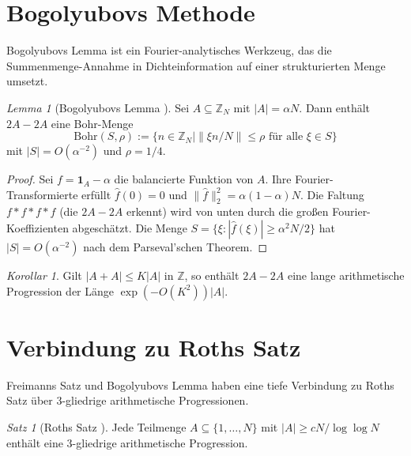 \documentclass[12pt,a4paper]{amsart}
\theoremstyle{definition}
\theoremstyle{remark}
\newtheorem{satz}[theorem]{Satz}
\newtheorem{korollar}[theorem]{Korollar}
\newtheorem{lemma_de}[theorem]{Lemma}
\newcommand{\Z}{\mathbb{Z}}
\begin{document}
\section{Bogolyubovs Methode}\label{sec:bogolyubov}

Bogolyubovs Lemma ist ein Fourier-analytisches Werkzeug, das die Summenmenge-Annahme
in Dichteinformation auf einer strukturierten Menge umsetzt.

\begin{lemma_de}[Bogolyubovs Lemma \cite{Bogolyubov1939}]\label{lem:bogolyubov}
Sei $A \subseteq \Z_N$ mit $|A| = \alpha N$. Dann enthält $2A - 2A$ eine Bohr-Menge
\[
  \mathrm{Bohr}(S, \rho) := \{n \in \Z_N \mid \|\xi n / N\| \leq \rho
  \text{ für alle } \xi \in S\}
\]
mit $|S| = O(\alpha^{-2})$ und $\rho = 1/4$.
\end{lemma_de}

\begin{proof}
Sei $f = \mathbf{1}_A - \alpha$ die balancierte Funktion von $A$. Ihre
Fourier-Transformierte erfüllt $\hat{f}(0) = 0$ und $\|\hat{f}\|_2^2 =
\alpha(1-\alpha)N$. Die Faltung $f * f * f * f$ (die $2A - 2A$ erkennt) wird von
unten durch die großen Fourier-Koeffizienten abgeschätzt. Die Menge
$S = \{\xi : |\hat{f}(\xi)| \geq \alpha^2 N / 2\}$ hat $|S| = O(\alpha^{-2})$
nach dem Parseval'schen Theorem.
\end{proof}

\begin{korollar}
Gilt $|A + A| \leq K|A|$ in $\Z$, so enthält $2A - 2A$ eine lange arithmetische
Progression der Länge $\exp(-O(K^2)) |A|$.
\end{korollar}

\section{Verbindung zu Roths Satz}\label{sec:roth}

Freimanns Satz und Bogolyubovs Lemma haben eine tiefe Verbindung zu Roths Satz
über 3-gliedrige arithmetische Progressionen.

\begin{satz}[Roths Satz \cite{Roth1953}]\label{satz:roth}
Jede Teilmenge $A \subseteq \{1, \ldots, N\}$ mit
$|A| \geq c N / \log\log N$
enthält eine 3-gliedrige arithmetische Progression.
\end{satz}
\end{document}
